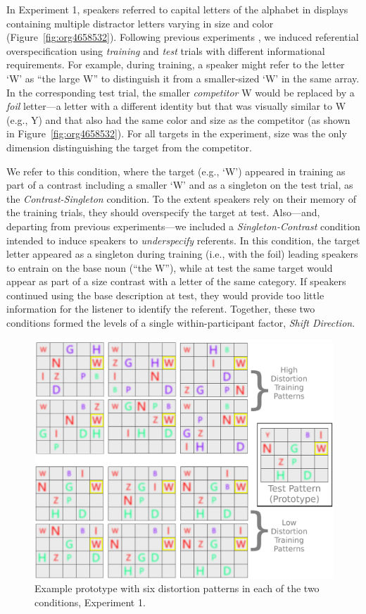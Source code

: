 \documentclass[natbib,doc,a4paper]{apa6}
\begin{document}
In Experiment 1, speakers referred to capital letters of the alphabet in displays containing multiple distractor letters varying in size and color (Figure~\ref{fig:org4658532}). Following previous experiments \citep{brennanclark96,GannBarr2014}, we induced referential overspecification using \emph{training} and \emph{test} trials with different informational requirements. For example, during training, a speaker might refer to the letter `W' as ``the large W'' to distinguish it from a smaller-sized `W' in the same array. In the corresponding test trial, the smaller \emph{competitor} W would be replaced by a \emph{foil} letter---a letter with a different identity but that was visually similar to W (e.g., Y) and that also had the same color and size as the competitor (as shown in Figure~\ref{fig:org4658532}). For all targets in the experiment, size was the only dimension distinguishing the target from the competitor.

We refer to this condition, where the target (e.g., `W') appeared in training as part of a contrast including a smaller `W' and as a singleton on the test trial, as the  \emph{Contrast-Singleton} condition. To the extent speakers rely on their memory of the training trials, they should overspecify the target at test. Also---and, departing from previous experiments---we included a \emph{Singleton-Contrast} condition intended to induce speakers to \emph{underspecify} referents. In this condition, the target letter appeared as a singleton during training (i.e., with the foil) leading speakers to entrain on the base noun (``the W''), while at test the same target would appear as part of a size contrast with a letter of the same category. If speakers continued using the base description at test, they would provide too little information for the listener to identify the referent.  Together, these two conditions formed the levels of a single within-participant factor, \emph{Shift Direction}.

\begin{figure}[htbp]
\centering
\includegraphics[width=.9\linewidth]{figs/Exp1_HvL.png}
\caption{\label{fig:org3934942}
Example prototype with six distortion patterns in each of the two conditions, Experiment 1.}
\end{figure}
\end{document}
